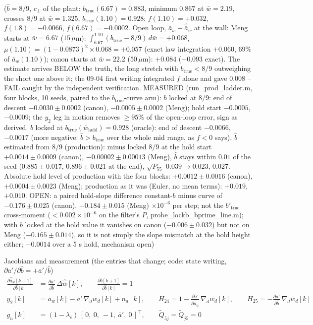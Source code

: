 \documentclass[11pt,a4paper,fontset=none]{ctexart}
\newcommand{\ba}{\bar{a}}
\newcommand{\bw}{\bar{w}}
\newcommand{\dWh}{\Delta\hat{\bw}}
\newcommand{\ap}{\ba'}
\begin{document}
($\hat{b} = 8/9$, $c_\perp$ of the plant: $b_{\mathrm{true}}(6.67) = 0.883$, minimum $0.867$ at $\bw = 2.19$, crosses $8/9$ at $\bw = 1.325$,
$b_{\mathrm{true}}(1.10) = 0.928$; $f(1.10) = +0.032$, $f(1.8) = -0.0066$, $f(6.67) = -0.0002$.
Open loop, $\ba_w - \hat{\ba}_w$ at the wall: Meng starts at $\bw = 6.67$ ($15\,\mu$m): $\int_{6.67}^{1.10}(b_{\mathrm{true}} - 8/9)\,d\bw = +0.068$,
$\mu(1.10) = (1-0.0873)^{2}\times 0.068 = +0.057$ (exact law integration $+0.060$, $69\%$ of $\ba_w(1.10)$); canon starts at $\bw = 22.2$
($50\,\mu$m): $+0.084$ ($+0.093$ exact). The estimate arrives BELOW the truth, the long stretch with $b_{\mathrm{true}} < 8/9$
outweighing the short one above it; the 09-04 first writing integrated $f$ alone and gave $0.008$ -- FAIL caught by the
independent verification. MEASURED (run\_prod\_ladder.m, four blocks, 10 seeds, paired to the $b_{\mathrm{true}}$-curve arm):
$b$ locked at $8/9$: end of descent $-0.0030 \pm 0.0002$ (canon), $-0.0005 \pm 0.0002$ (Meng); hold start $-0.0005$, $-0.0009$;
the $y_2$ leg in motion removes $\ge 95\%$ of the open-loop error, sign as derived. $b$ locked at $b_{\mathrm{true}}(\bw_{\mathrm{hold}}) = 0.928$
(oracle): end of descent $-0.0066$, $-0.0017$ (more negative: $\hat{b} > b_{\mathrm{true}}$ over the whole mid range, as $f < 0$ says).
$\hat{b}$ estimated from $8/9$ (production): minus locked $8/9$ at the hold start $+0.0014 \pm 0.0009$ (canon), $-0.00002 \pm 0.00013$ (Meng),
$\hat{b}$ stays within $0.01$ of the seed ($0.885 \pm 0.017$, $0.896 \pm 0.021$ at the end), $\sqrt{P_{55}}$ $0.039 \to 0.023$, $0.027$.
Absolute hold level of production with the four blocks: $+0.0012 \pm 0.0016$ (canon), $+0.0004 \pm 0.0023$ (Meng); production as it
was (Euler, no mean terms): $+0.019$, $+0.010$. OPEN: a paired hold-slope difference constant-$b$ minus curve of $-0.176 \pm 0.025$ (canon),
$-0.184 \pm 0.015$ (Meng) $\times 10^{-6}$ per step; not the $b'_{\mathrm{true}}$ cross-moment ($< 0.002\times10^{-6}$ on the filter's $P$,
probe\_lockb\_bprime\_line.m); with $b$ locked at the hold value it vanishes on canon ($-0.006 \pm 0.032$) but not on Meng
($-0.165 \pm 0.014$), so it is not simply the slope mismatch at the hold height either; $-0.0014$ over a 5 s hold, mechanism open)

Jacobians and measurement (the entries that change; code: state writing, $\partial\ap/\partial\hat{b} = +\ap/\hat{b}$)
\begin{align*}
\frac{\partial \hat{\ba}_w[k+1]}{\partial \hat{b}[k]} &= \frac{\partial\ap}{\partial\hat{b}}\,\dWh[k] , \qquad
\frac{\partial \hat{b}[k+1]}{\partial \hat{b}[k]} = 1 \\
y_2[k] &= \ba_w[k] - \ap\,\nabla_d\bw_d[k] + n_a[k] , \qquad
H_{24} = 1 - \frac{\partial\ap}{\partial\hat{\ba}_w}\,\nabla_d\bw_d[k] , \qquad
H_{25} = -\frac{\partial\ap}{\partial\hat{b}}\,\nabla_d\bw_d[k] \\
g_n[k] &= (1-\lambda_c)\,[\,0,\ 0,\ -1,\ \ap,\ 0\,]^{\top} , \qquad
\tilde{Q}_{5j} = \tilde{Q}_{j5} = 0
\end{align*}
\end{document}

